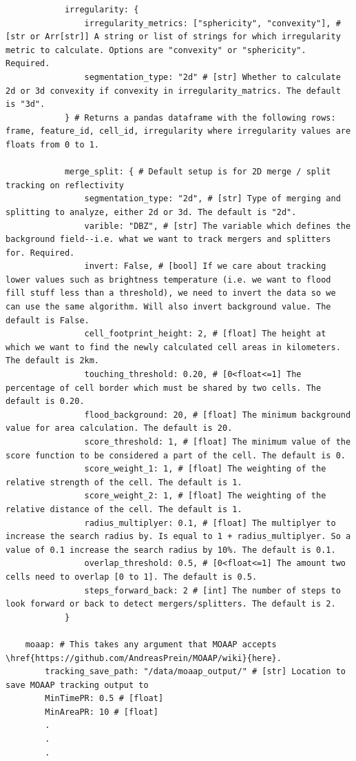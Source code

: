 \documentclass[10pt,a4paper]{article}
\begin{document}
\begin{lstlisting}
			irregularity: {
				irregularity_metrics: ["sphericity", "convexity"], # [str or Arr[str]] A string or list of strings for which irregularity metric to calculate. Options are "convexity" or "sphericity". Required.
				segmentation_type: "2d" # [str] Whether to calculate 2d or 3d convexity if convexity in irregularity_matrics. The default is "3d".
			} # Returns a pandas dataframe with the following rows: frame, feature_id, cell_id, irregularity where irregularity values are floats from 0 to 1.
		
			merge_split: { # Default setup is for 2D merge / split tracking on reflectivity
				segmentation_type: "2d", # [str] Type of merging and splitting to analyze, either 2d or 3d. The default is "2d".
				varible: "DBZ", # [str] The variable which defines the background field--i.e. what we want to track mergers and splitters for. Required.
				invert: False, # [bool] If we care about tracking lower values such as brightness temperature (i.e. we want to flood fill stuff less than a threshold), we need to invert the data so we can use the same algorithm. Will also invert background value. The default is False.
				cell_footprint_height: 2, # [float] The height at which we want to find the newly calculated cell areas in kilometers. The default is 2km.
				touching_threshold: 0.20, # [0<float<=1] The percentage of cell border which must be shared by two cells. The default is 0.20.
				flood_background: 20, # [float] The minimum background value for area calculation. The default is 20.
				score_threshold: 1, # [float] The minimum value of the score function to be considered a part of the cell. The default is 0.
				score_weight_1: 1, # [float] The weighting of the relative strength of the cell. The default is 1.
				score_weight_2: 1, # [float] The weighting of the relative distance of the cell. The default is 1.
				radius_multiplyer: 0.1, # [float] The multiplyer to increase the search radius by. Is equal to 1 + radius_multiplyer. So a value of 0.1 increase the search radius by 10%. The default is 0.1.
				overlap_threshold: 0.5, # [0<float<=1] The amount two cells need to overlap [0 to 1]. The default is 0.5.
				steps_forward_back: 2 # [int] The number of steps to look forward or back to detect mergers/splitters. The default is 2.
			}
		
	moaap: # This takes any argument that MOAAP accepts \href{https://github.com/AndreasPrein/MOAAP/wiki}{here}.
		tracking_save_path: "/data/moaap_output/" # [str] Location to save MOAAP tracking output to
		MinTimePR: 0.5 # [float]
		MinAreaPR: 10 # [float]
		.
		.
		.
		

\end{lstlisting}
\end{document}
